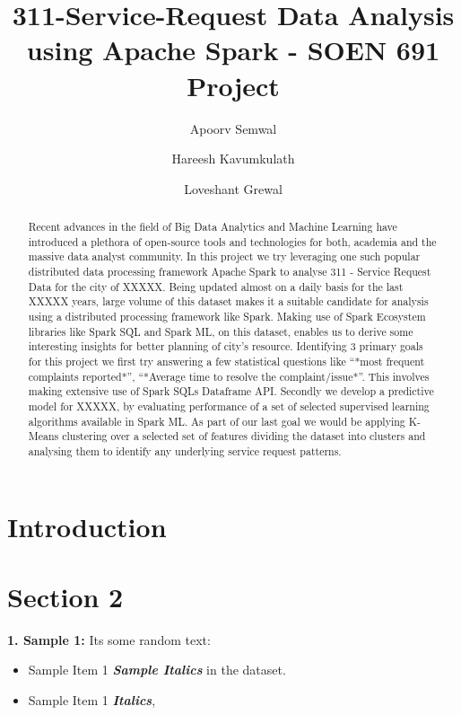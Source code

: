 \documentclass[10pt,twocolumn,letterpaper]{article}
\begin{document}
\title{311-Service-Request Data Analysis using Apache Spark - SOEN 691 Project}
\author{Apoorv Semwal \and Hareesh Kavumkulath \and Loveshant Grewal}
\maketitle

\begin{abstract}
Recent advances in the field of Big Data Analytics and Machine Learning have introduced a plethora of open-source tools and technologies for both, 
academia and the massive data analyst community. In this project we try leveraging one such popular distributed data processing framework Apache Spark
to analyse 311 - Service Request Data for the city of XXXXX. Being updated almost on a daily basis for the last XXXXX years, large volume of this dataset makes it a suitable candidate for analysis using a distributed processing framework like Spark. Making use of Spark Ecosystem libraries like Spark SQL and Spark ML, on this dataset, enables us to derive some interesting insights for better planning of city's resource. Identifying 3 primary goals for this project we first try answering a few statistical questions like “*most frequent complaints reported*”, “*Average time to resolve the complaint/issue*”.
This involves making extensive use of Spark SQLs Dataframe API. Secondly we develop a predictive model for XXXXX, by evaluating performance of a set of 
selected supervised learning algorithms available in Spark ML. As part of our last goal we would be applying K-Means clustering over a selected set 
of features dividing the dataset into clusters and analysing them to identify any underlying service request patterns.
\end{abstract}

\section{Introduction}

\section{Section 2}

\textbf{1. Sample 1:} Its some random text:
\begin{itemize}
  \item Sample Item 1 \textbf{{\em Sample Italics}} in the dataset.
  \item Sample Item 1 \textbf{{\em Italics}}, 
\end{itemize}
\end{document}
